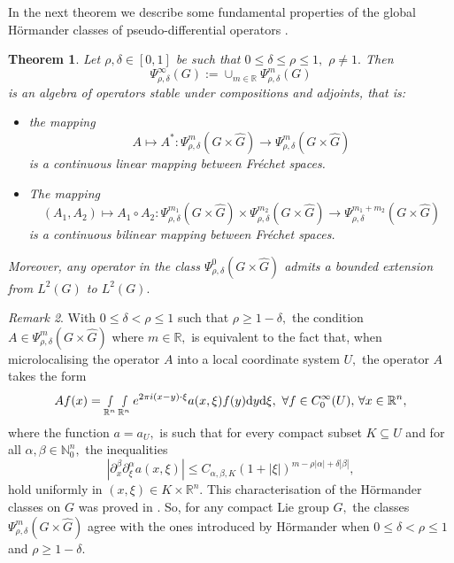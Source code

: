 \documentclass[12pt, reqno]{amsart}
\newtheorem{theorem}{Theorem}[section]
\theoremstyle{definition}
\theoremstyle{remark}
\newtheorem{remark}[theorem]{Remark}
\numberwithin{equation}{section}
\begin{document}
In the next theorem we describe some fundamental properties of the global H\"ormander  classes of pseudo-differential operators  \cite{Ruz}.
\begin{theorem}\label{RTcalculus:Group} Let $\rho,\delta\in [0,1]$ be such that $0\leqslant \delta\leqslant \rho\leqslant 1,$ $\rho\neq 1.$  Then  $$\Psi^\infty_{\rho,\delta}(G):=\cup_{m\in \mathbb{R}} \Psi^m_{\rho,\delta}(G) $$   is an algebra of operators stable under compositions and adjoints, that is:
\begin{itemize}
    \item [1.] the mapping $$A\mapsto A^{*}:\Psi^{m}_{\rho,\delta}(G\times \widehat{G})\rightarrow \Psi^{m}_{\rho,\delta}(G\times \widehat{G})$$  is a continuous linear mapping between Fr\'echet spaces. 
\item [2.] The mapping $$ (A_1,A_2)\mapsto A_1\circ A_2: \Psi^{m_1}_{\rho,\delta}(G\times \widehat{G})\times \Psi^{m_2}_{\rho,\delta}(G\times \widehat{G})\rightarrow \Psi^{m_1+m_2}_{\rho,\delta}(G\times \widehat{G})$$ is a continuous bilinear mapping between Fr\'echet spaces.
\end{itemize}Moreover, any operator in the class   $ \Psi^{0}_{\rho,\delta}(G\times \widehat{G})$ admits a  bounded extension from $L^2(G)$ to  $L^2(G).$
\end{theorem} 
\begin{remark}With $0\leqslant \delta<\rho\leqslant 1$ such that $\rho\geq 1-\delta,$ the condition $A\in \Psi^m_{\rho,\delta}(G\times \widehat{G})$ where $m\in \mathbb{R},$ is equivalent to the fact that, when microlocalising the operator $A$ into a local coordinate system $U,$ the operator $A$ takes the form
\begin{equation*}
   Af(x)=\smallint\limits_{\mathbb{R}^n}\smallint\limits_{\mathbb{R}^n}e^{2\pi i (x-y)\cdot \xi}a(x,\xi)f(y)\textnormal{d}y\textnormal{d}\xi,\,\, \forall f\in C^\infty_0(U),\,\forall x\in \mathbb{R}^n,
\end{equation*} 
where the function $a=a_U,$ is  such that  for every compact subset $K\subseteq U$ and for all $\alpha,\beta\in \mathbb{N}_0^n,$  the inequalities\begin{equation}\label{seminorms}
  |\partial_{x}^\beta\partial_{\xi}^\alpha a(x,\xi)|\leqslant C_{\alpha,\beta,K}(1+|\xi|)^{m-\rho|\alpha|+\delta|\beta|},
\end{equation} hold uniformly in $(x,\xi)\in K\times \mathbb{R}^n.$  This characterisation of the H\"ormander classes on $G$  was proved in \cite{RuzhanskyTurunenWirth2014}. So, for any compact Lie group $G,$ the classes $\Psi^m_{\rho,\delta}(G\times \widehat{G})$ agree with the ones introduced by H\"ormander \cite{Hormander1985III} when $0\leqslant \delta<\rho\leqslant 1$ and  $\rho\geq 1-\delta.$   
\end{remark}
\end{document}
